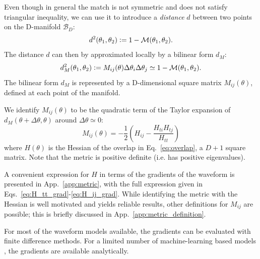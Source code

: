 \documentclass[twocolumn,showpacs,preprintnumbers,nofootinbib,prd,
superscriptaddress,10pt]{revtex4-2}
\begin{document}
Even though in general the match is not symmetric and does not satisfy triangular inequality, we can use it to introduce a {\it distance} $d$ between two points on the D-manifold $\mathcal{B}_D$:
\begin{align}\label{eq:distance}
	d^2(\theta_1,\theta_2) \vcentcolon= 1 - \mathcal{M}(\theta_1,\theta_2).
\end{align}
The distance $d$ can then by approximated locally by a bilinear form $d_M$:
\begin{align}\label{eq:metric_definition}
	d_M^2(\theta_1,\theta_2) \vcentcolon= M_{ij}(\theta) \Delta\theta_i \Delta\theta_j \simeq 1 - \mathcal{M}(\theta_1,\theta_2).
\end{align}
The bilinear form $d_M$ is represented by a D-dimensional square matrix $M_{ij}(\theta)$, defined at each point of the manifold.

We identify $M_{ij}(\theta)$ to be the quadratic term of the Taylor expansion of ${d_M(\theta+\Delta\theta,\theta)}$ around $\Delta\theta\simeq 0$:
\begin{equation}\label{eq:metric_expression}
	M_{ij}(\theta) = - \frac{1}{2} \left( H_{ij} - \frac{H_{ti}H_{tj}}{H_{tt}} \right)
\end{equation}
where $H(\theta)$ is the Hessian of the overlap in Eq.~\eqref{eq:overlap}, a $D+1$ square matrix.
Note that the metric is positive definite (i.e. has positive eigenvalues).

A convenient expression for $H$ in terms of the gradients of the waveform is presented in App.~\ref{app:metric}, with the full expression given in Eqs.~\eqref{eq:H_tt_grad}-\eqref{eq:H_ij_grad}.
While identifying the metric with the Hessian is well motivated and yields reliable results, other definitions for $M_{ij}$ are possible; this is briefly discussed in App.~\ref{app:metric_definition}.

For most of the waveform models available, the gradients can be evaluated with finite difference methods. For a limited number of machine-learning based models \cite{Chua:2018woh, Khan:2020fso, PhysRevD.103.043020, Thomas:2022rmc, Tissino:2022thn}, the gradients are available analytically.
\end{document}
